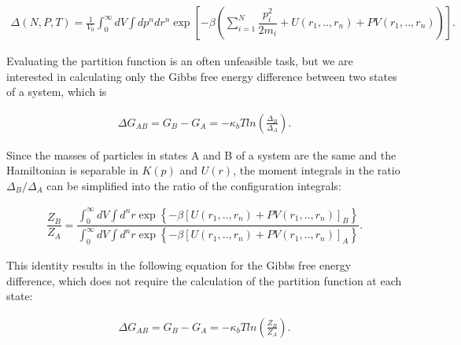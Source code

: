 \begin{equation}
\begin{aligned}
\Delta (N,P,T) = \frac{1}{V_{0}} \int_{0}^{\infty} dV \int dp^{n} dr^{n} \exp \left[ -\beta \left( \sum_{i=1}^{N}\dfrac{p_{i}^{2}}{2m_{i}} + U(r_{1},..,r_{n}) + PV(r_{1},..,r_{n}) \right) \right].
\end{aligned}
\end{equation}

Evaluating the partition function is an often unfeasible task, but we are interested in calculating only the Gibbs free energy difference between two states of a system, which is  

\begin{equation}
\begin{aligned}
\Delta G_{AB} = G_{B} - G_{A}= -\kappa_{b}T ln \left( \frac{\Delta_{B}}{\Delta_{A}}\right) .
\end{aligned}
\end{equation}

Since the masses of particles in states A and B of a system are the same and the Hamiltonian is separable in $K(p)$ and $U(r)$, the moment integrals in the ratio ${\Delta_{B}}/{\Delta_{A}}$ can be simplified into the ratio of the configuration integrals:

\begin{equation}
\label{eq:partiso}
\begin{aligned}
\dfrac{Z_{B}}{Z_{A}} = \dfrac{\int_{0}^{\infty} dV \int d^{n}r \exp \left\lbrace -\beta \left[U(r_{1},..,r_{n}) + PV(r_{1},..,r_{n}) \right]_{B} \right\rbrace}{\int_{0}^{\infty} dV \int d^{n}r \exp \left\lbrace  -\beta \left[U(r_{1},..,r_{n}) + PV(r_{1},..,r_{n}) \right]_{A} \right\rbrace }.
\end{aligned}
\end{equation}

This identity results in the following equation for the Gibbs free energy difference, which does not  require the calculation of the partition function at each state:

\begin{equation}
\label{eq:dif}
\begin{aligned}
\Delta G_{AB} = G_{B} - G_{A}= -\kappa_{b}T ln \left( \frac{Z_{B}}{Z_{A}}\right).
\end{aligned}
\end{equation}

